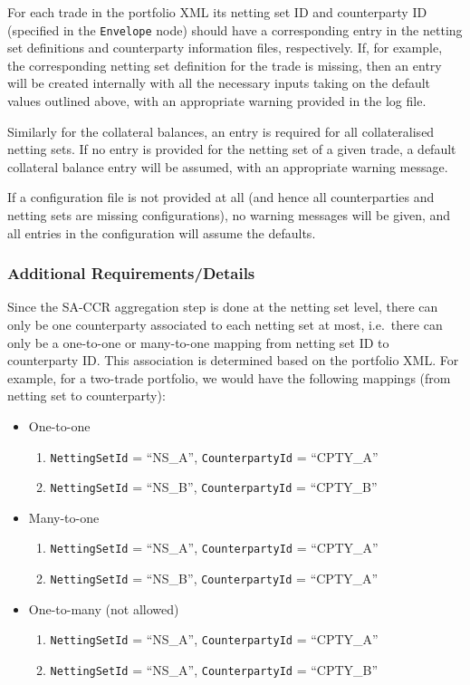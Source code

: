 {For each trade in the portfolio XML its netting set ID and counterparty ID (specified in the
\lstinline!Envelope! node) should have a corresponding entry in the netting set definitions
and counterparty information files, respectively. If, for example, the corresponding netting
set definition for the trade is missing, then an entry will be created internally with all
the necessary inputs taking on the default values outlined above, with an appropriate warning
provided in the log file.

Similarly for the collateral balances, an entry is required for all collateralised netting sets.
If no entry is provided for the netting set of a given trade, a default collateral balance entry
will be assumed, with an appropriate warning message.

If a configuration file is not provided at all (and hence all counterparties and netting sets are
missing configurations), no warning messages will be given, and all entries in the configuration
will assume the defaults.

\subsubsection*{Additional Requirements/Details}

Since the SA-CCR aggregation step is done at the netting set level, there can only be one
counterparty associated to each netting set at most, i.e.\ there can only be a one-to-one or
many-to-one mapping from netting set ID to counterparty ID. This association is determined based
on the portfolio XML. For example, for a two-trade portfolio, we would have the following mappings
(from netting set to counterparty):
\begin{itemize}
  \item One-to-one
    \begin{enumerate}
      \item \lstinline!NettingSetId! = ``NS\_A'', \lstinline!CounterpartyId! = ``CPTY\_A''
      \item \lstinline!NettingSetId! = ``NS\_B'', \lstinline!CounterpartyId! = ``CPTY\_B''
    \end{enumerate}
  \item Many-to-one
    \begin{enumerate}
      \item \lstinline!NettingSetId! = ``NS\_A'', \lstinline!CounterpartyId! = ``CPTY\_A''
      \item \lstinline!NettingSetId! = ``NS\_B'', \lstinline!CounterpartyId! = ``CPTY\_A''
    \end{enumerate}
  \item One-to-many (not allowed)
    \begin{enumerate}
      \item \lstinline!NettingSetId! = ``NS\_A'', \lstinline!CounterpartyId! = ``CPTY\_A''
      \item \lstinline!NettingSetId! = ``NS\_A'', \lstinline!CounterpartyId! = ``CPTY\_B''
    \end{enumerate}
\end{itemize}

}
